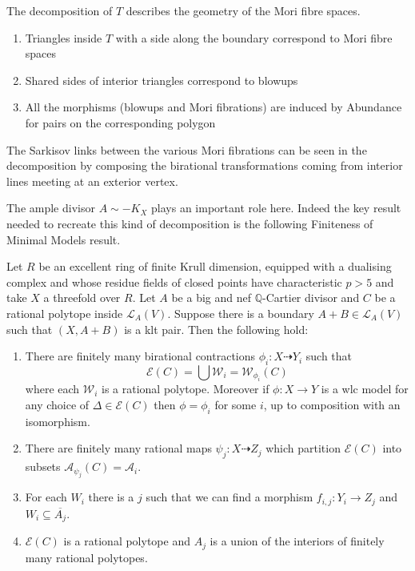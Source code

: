 \documentclass[a4paper,12pt]{book}
\begin{document}
	The decomposition of $T$ describes the geometry of the Mori fibre spaces.
	\begin{enumerate}
		\item Triangles inside $T$ with a side along the boundary correspond to Mori fibre spaces
		\item Shared sides of interior triangles correspond to blowups
		\item All the morphisms (blowups and Mori fibrations) are induced by Abundance for pairs on the corresponding polygon
	\end{enumerate}

	The Sarkisov links between the various Mori fibrations can be seen in the decomposition by composing the birational transformations coming from interior lines meeting at an exterior vertex.

	The ample divisor $A\sim -K_{X}$ plays an important role here. Indeed the key result needed to recreate this kind of decomposition is the following Finiteness of Minimal Models result.
	
	\begin{theo}\label{Main_Finite2}
		Let $R$ be an excellent ring of finite Krull dimension, equipped with a dualising complex and whose residue fields of closed points have characteristic $p>5$ and take $X$ a threefold over $R$. Let $A$ be a big and nef $\mathbb{Q}$-Cartier divisor and $C$ be a rational polytope inside $\mathcal{L}_{A}(V)$. Suppose there is a boundary $A+B \in \mathcal{L}_{A}(V)$ such that $(X,A+B)$ is a klt pair. Then the following hold:
		
		\begin{enumerate}
			\item There are finitely many birational contractions $\phi_{i}:X \dashrightarrow Y_{i}$ such that 
			\[\mathcal{E}(C) = \bigcup \mathcal{W}_{i}=\mathcal{W}_{\phi_{i}}(C)\]
			where each $\mathcal{W}_{i}$ is a rational polytope. Moreover if $\phi:X \to Y$ is a wlc model for any choice of $\Delta \in \mathcal{E}(C)$ then $\phi=\phi_{i}$ for some $i$, up to composition with an isomorphism.
			
			\item There are finitely many rational maps $\psi_{j}:X \dashrightarrow Z_{j}$ which partition $\mathcal{E}(C)$ into subsets $\mathcal{A}_{\psi_{j}}(C)=\mathcal{A}_{i}$.
			\item  For each $W_{i}$ there is a $j$ such that we can find a morphism $f_{i,j}: Y_{i} \to Z_{j}$ and $W_{i} \subseteq \overline{A_{j}}$.
			\item  $\mathcal{E}(C)$ is a rational polytope and $A_{j}$ is a union of the interiors of finitely many rational polytopes.
		\end{enumerate}
	\end{theo}
	
\end{document}
